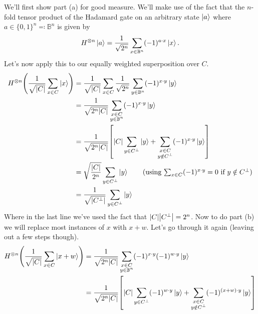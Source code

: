 \documentclass[boxes,pages]{homework}
\begin{document}
\begin{solution}
	We'll first show part (a) for good measure. We'll make use of the fact that the $n$-fold tensor product of the Hadamard gate on an arbitrary state $\ket{a}$ where $a\in\{0, 1\}^n\eqqcolon\mathbb{B}^n$ is given by
	\begin{equation*}
		H^{\otimes n}\ket{a} = \frac{1}{\sqrt{2^n}}\sum_{x\in\mathbb{B}^n}(-1)^{a\cdot x}\ket{x}.
	\end{equation*}
	Let's now apply this to our equally weighted superposition over $C$.
	\begin{align*}
		H^{\otimes n}\qty(\frac{1}{\sqrt{\abs{C}}}\sum_{x\in C}\ket{x}) & = \frac{1}{\sqrt{\abs{C}}}\sum_{x\in C}\frac{1}{\sqrt{2^n}}\sum_{y\in\mathbb{B}^n}(-1)^{x\cdot y}\ket{y}                   \\
		                                                                & = \frac{1}{\sqrt{2^n\abs{C}}}\sum_{\substack{x\in C                                                                        \\ y\in\mathbb{B}^n}}(-1)^{x\cdot y}\ket{y} \\
		                                                                & = \frac{1}{\sqrt{2^n\abs{C}}}\qty[\abs{C}\sum_{y\in C^\perp}\ket{y} + \sum_{\substack{x\in C                               \\ y\notin C^\perp}}(-1)^{x\cdot y}\ket{y}] \\
		                                                                & = \sqrt{\frac{\abs{C}}{2^n}}\sum_{y\in C^\perp}\ket{y} \tag{using $\sum_{x\in C}(-1)^{x\cdot y} = 0$ if $y\notin C^\perp$} \\
		                                                                & = \frac{1}{\sqrt{\abs{C^\perp}}}\sum_{y\in C^\perp}\ket{y}
	\end{align*}
	Where in the last line we've used the fact that $\abs{C}\abs{C^\perp} = 2^n$.
	Now to do part (b) we will replace most instances of $x$ with $x + w$. Let's go through it again (leaving out a few steps though).
	\begin{align*}
		H^{\otimes n}\qty(\frac{1}{\sqrt{\abs{C}}}\sum_{x\in C}\ket{x + w}) & = \frac{1}{\sqrt{2^n\abs{C}}}\sum_{\substack{x\in C                                                         \\ y\in\mathbb{B}^n}}(-1)^{x\cdot y}(-1)^{w\cdot y}\ket{y} \\
		                                                                    & = \frac{1}{\sqrt{2^n\abs{C}}}\qty[\abs{C}\sum_{y\in C^\perp}(-1)^{w\cdot y}\ket{y} + \sum_{\substack{x\in C \\ y\notin C^\perp}}(-1)^{(x+w)\cdot y}\ket{y}] \\

\end{align*}
\end{solution}
\end{document}
